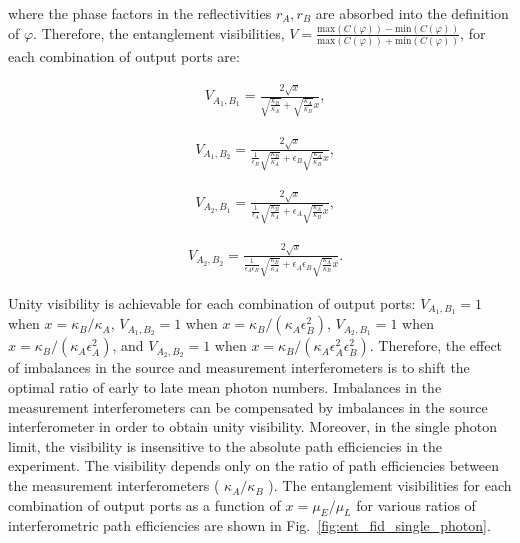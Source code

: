 \documentclass[11pt]{caltech_thesis} %
\begin{document}
where the phase factors in the reflectivities $r_A, r_B$ are absorbed into the definition of $\varphi$. Therefore, the entanglement visibilities, $V = \frac{\text{max}(C(\varphi))-\text{min}(C(\varphi))}{\text{max}(C(\varphi))+\text{min}(C(\varphi))}$, for each combination of output ports are:

\hypertarget{eq:FA1B1}{}{
\begin{align}
    &V_{A_1, B_1} = \frac{2\sqrt{x}}{\sqrt{\frac{\kappa_B}{\kappa_A}}+\sqrt{\frac{\kappa_A}{\kappa_B}}x}, \label{eq:FA1B1}
\end{align}
}

\hypertarget{eq:FA1B2}{}{
\begin{align}
    &V_{A_1, B_2} = \frac{2\sqrt{x}}{\frac{1}{\epsilon_B}\sqrt{\frac{\kappa_B}{\kappa_A}}+\epsilon_B\sqrt{\frac{\kappa_A}{\kappa_B}}x},\label{eq:FA1B2}
\end{align}
}

\hypertarget{eq:FA2B1}{}{
\begin{align}
    &V_{A_2, B_1} =  \frac{2\sqrt{x}}{ \frac{1}{\epsilon_A}\sqrt{\frac{\kappa_B}{\kappa_A}}+\epsilon_A\sqrt{\frac{\kappa_A}{\kappa_B}}x},\label{eq:FA2B1}
\end{align}
}

\hypertarget{eq:FA2B2}{}{
\begin{align}
    &V_{A_2, B_2} = \frac{2\sqrt{x}}{\frac{1}{\epsilon_A\epsilon_B}\sqrt{\frac{\kappa_B}{\kappa_A}}+\epsilon_A\epsilon_B\sqrt{\frac{\kappa_A}{\kappa_B}}x}.\label{eq:FA2B2}
\end{align}
}

Unity visibility is achievable for each combination of output ports: $V_{A_1, B_1} = 1$ when $x = \kappa_B/\kappa_A$, $V_{A_1, B_2} = 1$ when $x = \kappa_B/(\kappa_A\epsilon_B^2)$, $V_{A_2, B_1} = 1$ when $x = \kappa_B/(\kappa_A\epsilon_A^2)$, and $V_{A_2, B_2} = 1$ when $x = \kappa_B/(\kappa_A\epsilon_A^2\epsilon_B^2)$. Therefore, the effect of imbalances in the source and measurement interferometers is to shift the optimal ratio of early to late mean photon numbers. Imbalances in the measurement interferometers can be compensated by imbalances in the source interferometer in order to obtain unity visibility. Moreover, in the single photon limit, the visibility is insensitive to the absolute path efficiencies in the experiment. The visibility depends only on the ratio of path efficiencies between the measurement interferometers ( $\kappa_A/\kappa_B$ ). The entanglement visibilities for each combination of output ports as a function of $x=\mu_E/\mu_L$ for various ratios of interferometric path efficiencies are shown in Fig.~\ref{fig:ent_fid_single_photon}.
\end{document}
